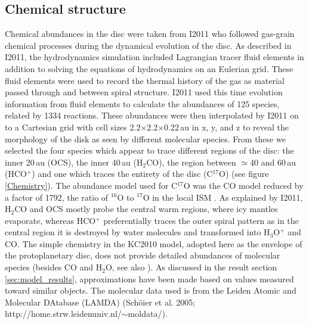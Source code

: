\documentclass[useAMS,usenatbib]{mn2e}
\begin{document}
\subsection{Chemical structure} \label{subsec:chemical_structure}
Chemical abundances in the disc were taken from I2011 who followed gas-grain chemical processes during the dynamical evolution of the disc. As described in I2011, the hydrodynamics simulation included Lagrangian tracer fluid elements in addition to solving the equations of hydrodynamics on an Eulerian grid.  These fluid elements were used to record the thermal history of the gas as material passed through and between spiral structure. I2011 used this time evolution information from fluid elements to calculate the abundances of 125 species, related by 1334 reactions.  These abundances were then interpolated by I2011 on to a Cartesian grid with cell sizes 2.2$\times$2.2$\times$0.22$\,$au in x, y, and z to reveal the morphology of the disk as seen by different molecular species. From these we selected the four species which appear to trace different regions of the disc: the inner 20\,au (OCS), the inner 40\,au (H$_2$CO),  the region between $\simeq$40 and 60\,au (HCO$^+$) and one which traces the entirety of the disc (C$^{17}$O) (see figure \ref{Chemistry}). The abundance model used for C$^{17}$O was the CO model reduced by a factor of 1792, the ratio of $^{16}$O to $^{17}$O in the local ISM \citep{Wilson1994}. As explained by I2011,  H$_2$CO and OCS mostly probe the central warm regions, where icy mantles evaporate, whereas HCO$^+$ preferentially traces the outer spiral pattern as in the central region it is destroyed by water molecules and transformed into H$_3$O$^+$ and CO. The simple chemistry in the KC2010 model, adopted here as the envelope of the protoplanetary disc, does not provide detailed abundances of molecular species (besides CO and H$_2$O, see also \cite{Caselli2012}). As discussed in the result section \ref{sec:model_results}, approximations have been made based on values measured toward similar objects. The molecular data used is from the Leiden Atomic and Molecular DAtabase (LAMDA) (Sch\"oier et al. 2005; http://home.strw.leidenuniv.nl/$\sim$moldata/).
\end{document}
